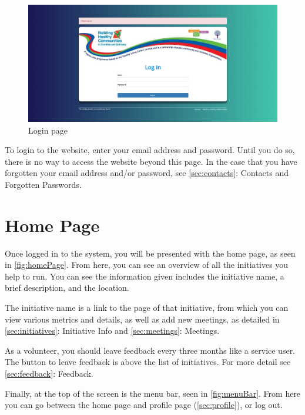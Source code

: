 \documentclass{bhcguides}
\begin{document}
\begin{figure}[h!]
 \centerline{\includegraphics[width=\textwidth, height=\textheight, keepaspectratio]{loginscreen.png}}
 \caption{Login page}
 \label{fig:initialLogin}
\end{figure}

To login to the website, enter your email address and password. Until you do so, there is no way to access the website beyond this page. In the case that you have forgotten your email address and/or password, see \autoref{sec:contacts}: Contacts and Forgotten Passwords.

\pagebreak

\section{Home Page}
\label{sec:homepage}

Once logged in to the system, you will be presented with the home page, as seen in \autoref{fig:homePage}. From here, you can see an overview of all the initiatives you help to run. You can see the information given includes the initiative name, a brief description, and the location.

The initiative name is a link to the page of that initiative, from which you can view various metrics and details, as well as add new meetings, as detailed in \autoref{sec:initiatives}: Initiative Info and \autoref{sec:meetings}: Meetings.

As a volunteer, you should leave feedback every three months like a service user. The button to leave feedback is above the list of initiatives. For more detail see \autoref{sec:feedback}: Feedback.

Finally, at the top of the screen is the menu bar, seen in \autoref{fig:menuBar}. From here you can go between the home page and profile page (\autoref{sec:profile}), or log out.
\end{document}
